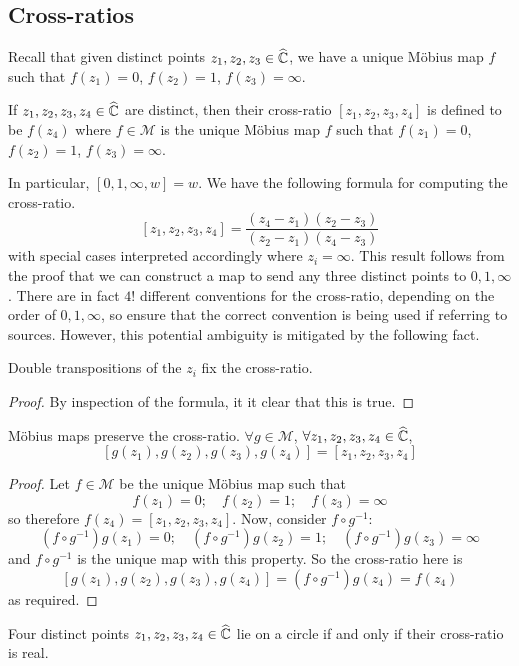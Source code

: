 \subsection{Cross-ratios}
Recall that given distinct points \(z_1, z_2, z_3 \in \widehat{\mathbb C}\), we have a unique M\"obius map \(f\) such that \(f(z_1) = 0\), \(f(z_2) = 1\), \(f(z_3) = \infty\).
\begin{definition}
	If \(z_1, z_2, z_3, z_4 \in \widehat{\mathbb C}\) are distinct, then their cross-ratio \([z_1, z_2, z_3, z_4]\) is defined to be \(f(z_4)\) where \(f \in \mathcal M\) is the unique M\"obius map \(f\) such that \(f(z_1) = 0\), \(f(z_2) = 1\), \(f(z_3) = \infty\).
\end{definition}
In particular, \([0, 1, \infty, w] = w\).
We have the following formula for computing the cross-ratio.
\[
	[z_1, z_2, z_3, z_4] = \frac{(z_4 - z_1)(z_2 - z_3)}{(z_2 - z_1)(z_4 - z_3)}
\]
with special cases interpreted accordingly where \(z_i = \infty\).
This result follows from the proof that we can construct a map to send any three distinct points to \(0, 1, \infty\).
There are in fact \(4!
\) different conventions for the cross-ratio, depending on the order of \(0, 1, \infty\), so ensure that the correct convention is being used if referring to sources.
However, this potential ambiguity is mitigated by the following fact.
\begin{proposition}
	Double transpositions of the \(z_i\) fix the cross-ratio.
\end{proposition}
\begin{proof}
	By inspection of the formula, it it clear that this is true.
\end{proof}
\begin{theorem}
	M\"obius maps preserve the cross-ratio.
	\(\forall g \in \mathcal M\), \(\forall z_1, z_2, z_3, z_4 \in \widehat{\mathbb C}\),
	\[
		[g(z_1), g(z_2), g(z_3), g(z_4)] = [z_1, z_2, z_3, z_4]
	\]
\end{theorem}
\begin{proof}
	Let \(f \in \mathcal M\) be the unique M\"obius map such that
	\[
		f(z_1) = 0;\quad f(z_2) = 1;\quad f(z_3) = \infty
	\]
	so therefore \(f(z_4) = [z_1, z_2, z_3, z_4]\).
	Now, consider \(f \circ g^{-1}\):
	\[
		(f \circ g^{-1})g(z_1) = 0;\quad (f \circ g^{-1})g(z_2) = 1;\quad (f \circ g^{-1})g(z_3) = \infty
	\]
	and \(f \circ g^{-1}\) is the unique map with this property.
	So the cross-ratio here is
	\[
		[g(z_1), g(z_2), g(z_3), g(z_4)] = (f \circ g^{-1})g(z_4) = f(z_4)
	\]
	as required.
\end{proof}
\begin{corollary}
	Four distinct points \(z_1, z_2, z_3, z_4 \in \widehat{\mathbb C}\) lie on a circle if and only if their cross-ratio is real.
\end{corollary}
